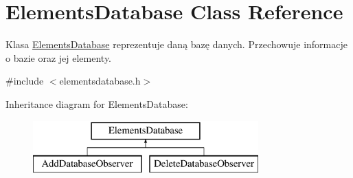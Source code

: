 \hypertarget{class_elements_database}{}\section{Elements\+Database Class Reference}
\label{class_elements_database}


Klasa \mbox{\hyperlink{class_elements_database}{Elements\+Database}} reprezentuje daną bazę danych. Przechowuje informacje o bazie oraz jej elementy.  




{\ttfamily \#include $<$elementsdatabase.\+h$>$}

Inheritance diagram for Elements\+Database\+:\begin{figure}[H]
\begin{center}
\leavevmode
\includegraphics[height=2.000000cm]{class_elements_database}
\end{center}
\end{figure}
